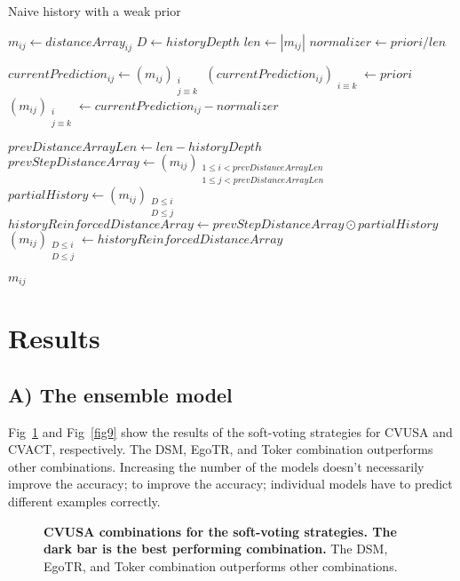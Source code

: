 \documentclass[10pt,letterpaper]{article}
\begin{document}
\begin{algorithm}[H]
  \caption{Naive history with a weak prior}\label{alg:three}
  $m_{ij} \gets distanceArray_{ij}$\;
  $D \gets historyDepth$\;
  $len \gets |m_{ij}|$\;
  $normalizer \gets priori/ len$\;
  
   {
      $currentPrediction_{ij} \gets (m_{ij})_{\substack{i\\ j \equiv k }}$\;
      $ (currentPrediction_{ij})_{\substack{i \equiv k}} \gets priori$\;
      $(m_{ij})_{\substack{i\\ j \equiv k }} \gets currentPrediction_{ij} - normalizer$\;
  }
  
   {
      $prevDistanceArrayLen \gets len - historyDepth$\;
      $prevStepDistanceArray \gets (m_{ij})_{\substack{1\le i < prevDistanceArrayLen \\ 1\le j < prevDistanceArrayLen }}$\;
      $partialHistory \gets (m_{ij})_{\substack{D \le i \\ D \le j}}$\;
      $historyReinforcedDistanceArray \gets prevStepDistanceArray \odot partialHistory$\;
      $(m_{ij})_{\substack{D \le i \\ D \le j}} \gets historyReinforcedDistanceArray$\;
  }
  
  \Return $m_{ij}$\;
  \end{algorithm}

\section*{Results}
\subsection*{A) The ensemble model}
Fig~\ref{fig8} and Fig~\ref{fig9} show the results of the soft-voting strategies for CVUSA and CVACT, respectively. The DSM, EgoTR, and Toker combination outperforms other combinations. Increasing the number of the models doesn’t necessarily improve the accuracy; to improve the accuracy; individual models have to predict different examples correctly.

\begin{figure}[!h]
  \caption{{\bf CVUSA combinations for the soft-voting strategies. The dark bar is the best performing combination.} The DSM, EgoTR, and Toker combination outperforms other combinations.}
  \label{fig8}
\end{figure}
\end{document}
